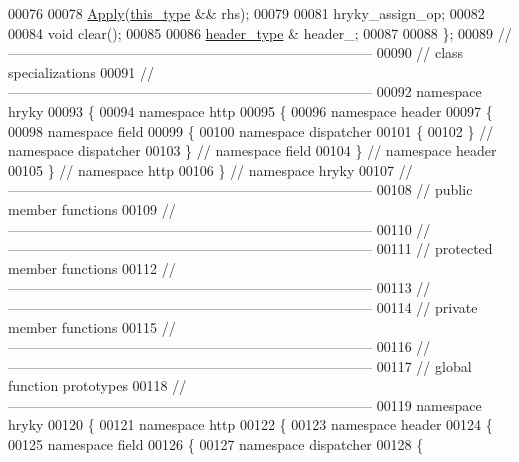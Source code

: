 \begin{DoxyCode}
00076 
00078     \hyperlink{classhryky_1_1http_1_1header_1_1field_1_1dispatcher_1_1_apply}{Apply}(\hyperlink{classhryky_1_1http_1_1header_1_1field_1_1dispatcher_1_1_apply}{this_type} && rhs);
00079 
00081     hryky\_assign\_op;
00082 
00084     \textcolor{keywordtype}{void} clear();
00085 
00086     \hyperlink{classhryky_1_1http_1_1header_1_1_entity}{header_type} & header\_;
00087 
00088 \};
00089 \textcolor{comment}{//
      ------------------------------------------------------------------------------}
00090 \textcolor{comment}{// class specializations}
00091 \textcolor{comment}{//
      ------------------------------------------------------------------------------}
00092 \textcolor{keyword}{namespace }hryky
00093 \{
00094 \textcolor{keyword}{namespace }http
00095 \{
00096 \textcolor{keyword}{namespace }header
00097 \{
00098 \textcolor{keyword}{namespace }field
00099 \{
00100 \textcolor{keyword}{namespace }dispatcher
00101 \{
00102 \} \textcolor{comment}{// namespace dispatcher}
00103 \} \textcolor{comment}{// namespace field}
00104 \} \textcolor{comment}{// namespace header}
00105 \} \textcolor{comment}{// namespace http}
00106 \} \textcolor{comment}{// namespace hryky}
00107 \textcolor{comment}{//
      ------------------------------------------------------------------------------}
00108 \textcolor{comment}{// public member functions}
00109 \textcolor{comment}{//
      ------------------------------------------------------------------------------}
00110 \textcolor{comment}{//
      ------------------------------------------------------------------------------}
00111 \textcolor{comment}{// protected member functions}
00112 \textcolor{comment}{//
      ------------------------------------------------------------------------------}
00113 \textcolor{comment}{//
      ------------------------------------------------------------------------------}
00114 \textcolor{comment}{// private member functions}
00115 \textcolor{comment}{//
      ------------------------------------------------------------------------------}
00116 \textcolor{comment}{//
      ------------------------------------------------------------------------------}
00117 \textcolor{comment}{// global function prototypes}
00118 \textcolor{comment}{//
      ------------------------------------------------------------------------------}
00119 \textcolor{keyword}{namespace }hryky
00120 \{
00121 \textcolor{keyword}{namespace }http
00122 \{
00123 \textcolor{keyword}{namespace }header
00124 \{
00125 \textcolor{keyword}{namespace }field
00126 \{
00127 \textcolor{keyword}{namespace }dispatcher
00128 \{

\end{DoxyCode}
